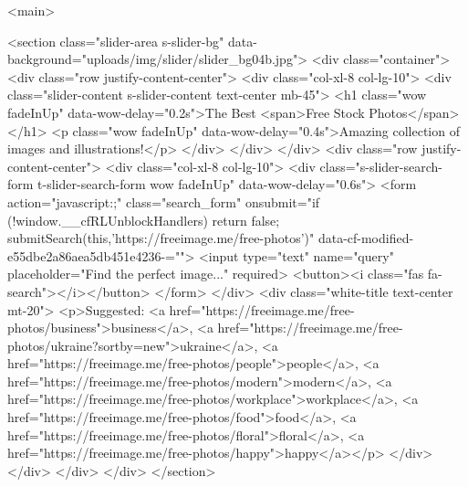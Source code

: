 <main>

<section class="slider-area s-slider-bg" data-background="uploads/img/slider/slider_bg04b.jpg">
<div class="container">
<div class="row justify-content-center">
<div class="col-xl-8 col-lg-10">
<div class="slider-content s-slider-content text-center mb-45">
<h1 class="wow fadeInUp" data-wow-delay="0.2s">The Best <span>Free Stock Photos</span></h1>
<p class="wow fadeInUp" data-wow-delay="0.4s">Amazing collection of images and illustrations!</p>
</div>
</div>
</div>
<div class="row justify-content-center">
<div class="col-xl-8 col-lg-10">
<div class="s-slider-search-form t-slider-search-form wow fadeInUp" data-wow-delay="0.6s">
<form action="javascript:;" class="search_form" onsubmit="if (!window.__cfRLUnblockHandlers) return false; submitSearch(this,'https://freeimage.me/free-photos')" data-cf-modified-e55dbe2a86aea5db451e4236-="">
<input type="text" name="query" placeholder="Find the perfect image..." required>
<button><i class="fas fa-search"></i></button>
</form>
</div>
<div class="white-title text-center mt-20">
<p>Suggested: <a href="https://freeimage.me/free-photos/business">business</a>, <a href="https://freeimage.me/free-photos/ukraine?sortby=new">ukraine</a>, <a href="https://freeimage.me/free-photos/people">people</a>, <a href="https://freeimage.me/free-photos/modern">modern</a>, <a href="https://freeimage.me/free-photos/workplace">workplace</a>, <a href="https://freeimage.me/free-photos/food">food</a>, <a href="https://freeimage.me/free-photos/floral">floral</a>, <a href="https://freeimage.me/free-photos/happy">happy</a></p>
</div>
</div>
</div>
</div>
</section>


